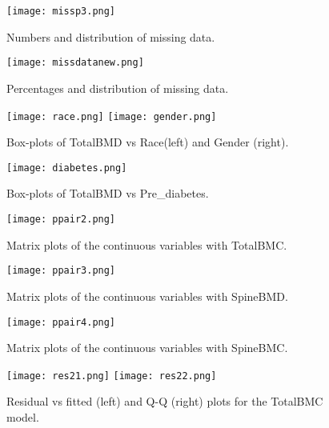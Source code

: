 \documentclass[11pt]{article}
\begin{document}
            \begin{figure}[!htbp]
            \centering
            \texttt{[image: missp3.png]}
            \caption{Numbers and distribution of missing data.}
            \label{fig:method}
            \end{figure}
            
            \begin{figure}[!htbp]
            \centering
            \texttt{[image: missdatanew.png]}
            \caption{Percentages and distribution of missing data.}
            \label{fig:method}
            \end{figure}
  
             \begin{figure}[!htbp]
            \texttt{[image: race.png]}
            \texttt{[image: gender.png]}
            \caption{Box-plots of TotalBMD vs Race(left) and Gender (right).}
            \label{fig:method}
            \end{figure}

            \begin{figure}[!htbp]
            \centering
            \texttt{[image: diabetes.png]}
            \caption{Box-plots of TotalBMD vs Pre\_diabetes.}
            \label{fig:method}
            \end{figure}

            \begin{figure}[!htbp]
            \centering
            \texttt{[image: ppair2.png]}
            \caption{Matrix plots of the continuous variables with TotalBMC.}
            \label{fig:method}
            \end{figure}

            \begin{figure}[!htbp]
            \centering
            \texttt{[image: ppair3.png]}
            \caption{Matrix plots of the continuous variables with SpineBMD.}
            \label{fig:method}
            \end{figure}

            \begin{figure}[!htbp]
            \centering
            \texttt{[image: ppair4.png]}
            \caption{Matrix plots of the continuous variables with SpineBMC.}
            \label{fig:method}
            \end{figure}
            
            \begin{figure}[!htbp]
            \centering
            \texttt{[image: res21.png]} \texttt{[image: res22.png]}
            \caption{Residual vs fitted (left) and Q-Q (right) plots for the TotalBMC model.}
            \label{fig:method}
            \end{figure}
\end{document}
